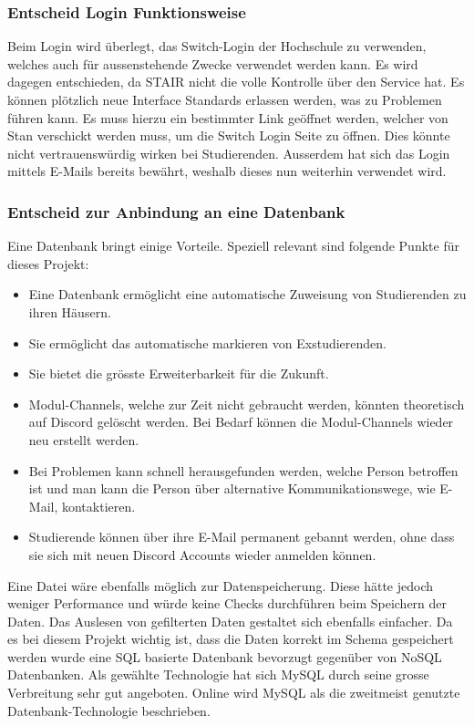 \documentclass[a4paper, table]{article}
\begin{document}
\subsubsection*{Entscheid Login Funktionsweise}

Beim Login wird überlegt, das Switch-Login der Hochschule zu verwenden, welches auch für aussenstehende Zwecke verwendet werden kann. 
Es wird dagegen entschieden, da STAIR nicht die volle Kontrolle über den Service hat. 
Es können plötzlich neue Interface Standards erlassen werden, was zu Problemen führen kann. 
Es muss hierzu ein bestimmter Link geöffnet werden, welcher von Stan verschickt werden muss, um die Switch Login Seite zu öffnen. 
Dies könnte nicht vertrauenswürdig wirken bei Studierenden. 
Ausserdem hat sich das Login mittels E-Mails bereits bewährt, weshalb dieses nun weiterhin verwendet wird.


\subsubsection*{Entscheid zur Anbindung an eine Datenbank}
Eine Datenbank bringt einige Vorteile. 
Speziell relevant sind folgende Punkte für dieses Projekt:
\begin{itemize}
    \item Eine Datenbank ermöglicht eine automatische Zuweisung von Studierenden zu ihren Häusern.
    \item Sie ermöglicht das automatische markieren von Exstudierenden.
    \item Sie bietet die grösste Erweiterbarkeit für die Zukunft.
    \item Modul-Channels, welche zur Zeit nicht gebraucht werden, könnten theoretisch auf Discord gelöscht werden. Bei Bedarf können die Modul-Channels wieder neu erstellt werden.
    \item Bei Problemen kann schnell herausgefunden werden, welche Person betroffen ist und man kann die Person über alternative Kommunikationswege, wie E-Mail, kontaktieren.
    \item Studierende können über ihre E-Mail permanent gebannt werden, ohne dass sie sich mit neuen Discord Accounts wieder anmelden können.
\end{itemize}
Eine Datei wäre ebenfalls möglich zur Datenspeicherung. 
Diese hätte jedoch weniger Performance und würde keine Checks durchführen beim Speichern der Daten. 
Das Auslesen von gefilterten Daten gestaltet sich ebenfalls einfacher.\autocite{castro_why_2020}
Da es bei diesem Projekt wichtig ist, dass die Daten korrekt im Schema gespeichert werden wurde eine SQL basierte Datenbank bevorzugt gegenüber von NoSQL Datenbanken. 
Als gewählte Technologie hat sich MySQL durch seine grosse Verbreitung sehr gut angeboten. 
Online wird MySQL als die zweitmeist genutzte Datenbank-Technologie beschrieben.\autocite{noauthor_db-engines_2022}
\end{document}
